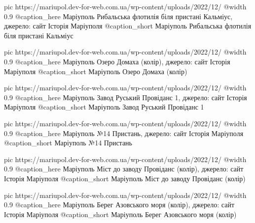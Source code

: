   pic https://mariupol.dev-for-web.com.ua/wp-content/uploads/2022/12/%
  @width 0.9
  @caption_here Маріуполь Рибальська флотилія біля пристані Кальміус, джерело: сайт Історія Маріуполя
  @caption_short Маріуполь Рибальська флотилія біля пристані Кальміус

  pic https://mariupol.dev-for-web.com.ua/wp-content/uploads/2022/12/%
  @width 0.9
  @caption_here Маріуполь Озеро Домаха (колір), джерело: сайт Історія Маріуполя
  @caption_short Маріуполь Озеро Домаха (колір)

  pic https://mariupol.dev-for-web.com.ua/wp-content/uploads/2022/12/%
  @width 0.9
  @caption_here Маріуполь Завод Руський Провіданс 1, джерело: сайт Історія Маріуполя
  @caption_short Маріуполь Завод Руський Провіданс 1

  pic https://mariupol.dev-for-web.com.ua/wp-content/uploads/2022/12/%
  @width 0.9
  @caption_here Маріуполь №14 Пристань, джерело: сайт Історія Маріуполя
  @caption_short Маріуполь №14 Пристань

  pic https://mariupol.dev-for-web.com.ua/wp-content/uploads/2022/12/%
  @width 0.9
  @caption_here Маріуполь Міст до заводу Провіданс (колір), джерело: сайт Історія Маріуполя
  @caption_short Маріуполь Міст до заводу Провіданс (колір)

  pic https://mariupol.dev-for-web.com.ua/wp-content/uploads/2022/12/%
  @width 0.9
  @caption_here Маріуполь Берег Азовського моря (колір), джерело: сайт Історія Маріуполя
  @caption_short Маріуполь Берег Азовського моря (колір)

